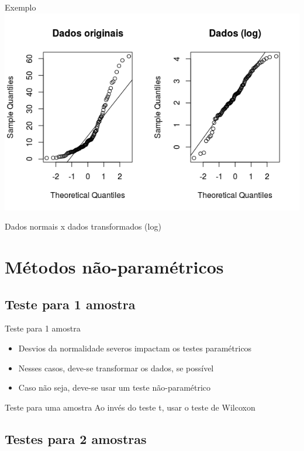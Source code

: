 \documentclass{beamer}
\begin{document}
\begin{frame}{Exemplo}
  \centering
  \includegraphics[width=\textwidth]{Nao_Param/transf-qq}

Dados normais x dados transformados (log)
\end{frame}

\section{Métodos não-paramétricos}

\subsection[1 amostra]{Teste para 1 amostra}

\begin{frame}{Teste para 1 amostra}
  \begin{itemize}
  \item Desvios da normalidade severos impactam os testes paramétricos
  \item Nesses casos, deve-se transformar os dados, se possível
  \item Caso não seja, deve-se usar um teste não-paramétrico
  \end{itemize}
  \begin{block}{Teste para uma amostra}
    Ao invés do teste t, usar o teste de Wilcoxon
  \end{block}
\end{frame}

\subsection[2 médias]{Testes para 2 amostras}
\end{document}
